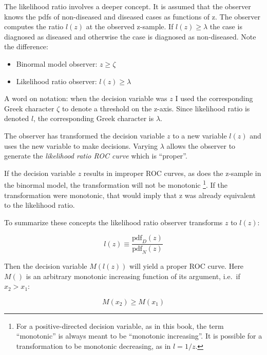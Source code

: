 \documentclass[
]{book}
\begin{document}
The likelihood ratio involves a deeper concept. It is assumed that the observer knows the pdfs of non-diseased and diseased cases as functions of z. The observer computes the ratio \(l(z)\) at the observed z-sample. If \(l(z) \ge \lambda\) the case is diagnosed as diseased and otherwise the case is diagnosed as non-diseased. Note the difference:

\begin{itemize}
\item
  Binormal model observer: \(z \ge \zeta\)
\item
  Likelihood ratio observer: \(l(z) \ge \lambda\)
\end{itemize}

A word on notation: when the decision variable was \(z\) I used the corresponding Greek character \(\zeta\) to denote a threshold on the z-axis. Since likelihood ratio is denoted \(l\), the corresponding Greek character is \(\lambda\).

The observer has transformed the decision variable \(z\) to a new variable \(l(z)\) and uses the new variable to make decisions. Varying \(\lambda\) allows the observer to generate the \emph{likelihood ratio ROC curve} which is ``proper''.

If the decision variable \(z\) results in improper ROC curves, as does the z-sample in the binormal model, the transformation will not be monotonic \footnote{For a positive-directed decision variable, as in this book, the term ``monotonic'' is always meant to be ``monotonic increasing''. It is possible for a transformation to be monotonic decreasing, as in \(l = 1/z\).}. If the transformation were monotonic, that would imply that z was already equivalent to the likelihood ratio.

To summarize these concepts the likelihood ratio observer transforms \(z\) to \(l(z)\):

\begin{equation} 
l\left( z \right) \equiv  \frac{\text{pdf}_D\left( z \right)}{\text{pdf}_N\left( z \right)}
\label{eq:proper-roc-models-likelihood-ratio-definition}
\end{equation}

Then the decision variable \(M\left( l\left( z \right) \right)\) will yield a proper ROC curve. Here \(M\left( \right)\) is an arbitrary monotonic increasing function of its argument, i.e.~if \(x_2 > x_1\):

\begin{equation} 
M\left( x_2 \right) \ge M\left( x_1 \right) 
\label{eq:proper-roc-models-definition-monotonic}
\end{equation}
\end{document}
